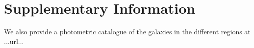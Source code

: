 \documentclass[fleqn,usenatbib]{mnras}
\begin{document}



\section*{Supplementary Information}
We also provide a photometric catalogue of the galaxies in the different regions at ...url...


%
% 



\bsp	%
\label{lastpage}
\end{document}
